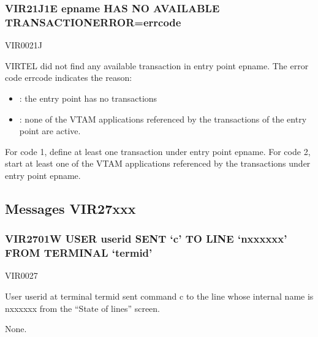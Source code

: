 \documentclass[letterpaper,10pt,english]{sphinxmanual}
\begin{document}
\subsubsection{VIR21J1E epname HAS NO AVAILABLE TRANSACTION\sphinxhyphen{}ERROR=errcode}
\label{\detokenize{messages:vir21j1e-epname-has-no-available-transaction-error-errcode}}\begin{description}
\sphinxAtStartPar
VIR0021J

\sphinxAtStartPar
VIRTEL did not find any available transaction in entry point epname. The error code errcode indicates the reason:
\begin{itemize}
\item {} 
 : the entry point has no transactions

\item {} 
 : none of the VTAM applications referenced by the transactions of the entry point are active.

\end{itemize}

\sphinxAtStartPar
For code 1, define at least one transaction under entry point epname. For code 2, start at least one of the VTAM applications referenced by the transactions under entry point epname.

\end{description}


\subsection{Messages VIR27xxx}
\label{\detokenize{messages:messages-vir27xxx}}

\subsubsection{VIR2701W USER userid SENT ‘c’ TO LINE ‘n\sphinxhyphen{}xxxxxx’ FROM TERMINAL ‘termid’}
\label{\detokenize{messages:vir2701w-user-userid-sent-c-to-line-n-xxxxxx-from-terminal-termid}}\begin{description}
\sphinxAtStartPar
VIR0027

\sphinxAtStartPar
User userid at terminal termid sent command c to the line whose internal name is n\sphinxhyphen{}xxxxxx from the “State of lines” screen.

\sphinxAtStartPar
None.

\end{description}
\end{document}
